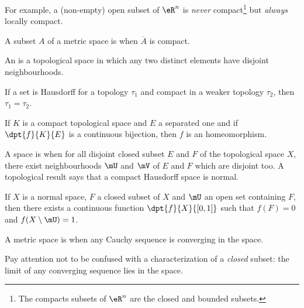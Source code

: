 For example, a (non-empty) open subset of $\eR^n$ is \emph{never} compact\footnote{The compacts subsets of $\eR^n$ are the closed and bounded subsets.} but \emph{always} locally compact.

\begin{definition}
A subset $A$ of a metric space is  when $\overline{A}$ is compact.
\end{definition}

\begin{definition}
An  is a topological space in which any two distinct elements have disjoint neighbourhoods.
\end{definition}

\begin{lemma}
If a set is Hausdorff for a topology $\tau_1$ and compact in a weaker topology $\tau_2$, then $\tau_1=\tau_2$.\label{lem:Hausweak}
\end{lemma}

\begin{proposition}
If $K$ is a compact topological space and $E$ a separated one and if $\dpt{f}{K}{E}$ is a continuous bijection, then $f$ is an homeomorphism. \label{lem:wiki}
\end{proposition}

\begin{definition}
    A space is  when for all disjoint closed subset $E$ and $F$ of the topological space $X$, there exist neighbourhoods $\mU$ and $\mV$ of $E$ and $F$ which are disjoint too. A topological result says that a compact Hausdorff space is normal.
\end{definition}

\begin{lemma}\label{lem:Urysohn}
If $X$ is a normal space, $F$ a closed subset of $X$ and $\mU$ an open set containing $F$, then there exists a continuous function $\dpt{f}{X}{[0,1]}$ such that $f(F)=0$ and $f(X\setminus\mU)=1$. 
\end{lemma}

\begin{definition}
A metric space is  when any Cauchy sequence is converging in the space.
\end{definition}

Pay attention not to be confused with a characterization of a \emph{closed} subset: the limit of any converging sequence lies in the space.

